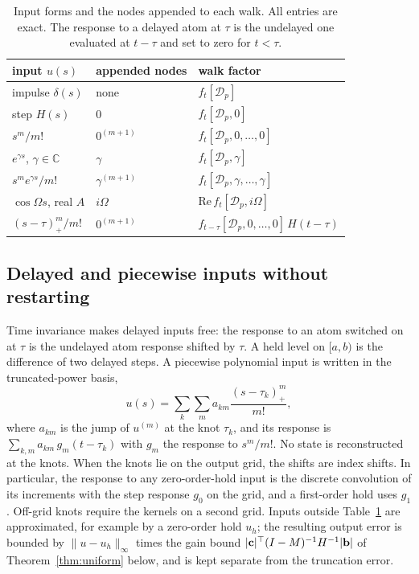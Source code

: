 \begin{table}[t]
\caption{Input forms and the nodes appended to each walk. All entries are exact. The response to a delayed atom at $\tau$ is the undelayed one evaluated at $t-\tau$ and set to zero for $t<\tau$.}\label{tab:inputs}
\footnotesize\setlength{\tabcolsep}{2pt}
\begin{ruledtabular}
\begin{tabular}{lll}
input $u(s)$ & appended nodes & walk factor\\\hline
impulse $\delta(s)$ & none & $f_t[\mathcal{D}_p]$\\
step $H(s)$ & $0$ & $f_t[\mathcal{D}_p,0]$\\
$s^m/m!$ & $0^{(m+1)}$ & $f_t[\mathcal{D}_p,0,\dots,0]$\\
$e^{\gamma s}$, $\gamma\in\mathbb{C}$ & $\gamma$ & $f_t[\mathcal{D}_p,\gamma]$\\
$s^me^{\gamma s}/m!$ & $\gamma^{(m+1)}$ & $f_t[\mathcal{D}_p,\gamma,\dots,\gamma]$\\
$\cos\Omega s$, real $A$ & $i\Omega$ & $\mathrm{Re}\,f_t[\mathcal{D}_p,i\Omega]$\\
$(s-\tau)_+^m/m!$ & $0^{(m+1)}$ & $f_{t-\tau}[\mathcal{D}_p,0,\dots,0]\,H(t-\tau)$\\
\end{tabular}
\end{ruledtabular}
\end{table}

\subsection{Delayed and piecewise inputs without restarting}\label{sec:piecewise}
Time invariance makes delayed inputs free: the response to an atom switched on at $\tau$ is the undelayed atom response shifted by $\tau$. A held level on $[a,b)$ is the difference of two delayed steps. A piecewise polynomial input is written in the truncated-power basis,
\begin{equation}\label{eq:truncpow}
u(s)=\sum_k\sum_{m}a_{km}\frac{(s-\tau_k)_+^m}{m!},
\end{equation}
where $a_{km}$ is the jump of $u^{(m)}$ at the knot $\tau_k$, and its response is $\sum_{k,m}a_{km}\,g_m(t-\tau_k)$ with $g_m$ the response to $s^m/m!$. No state is reconstructed at the knots. When the knots lie on the output grid, the shifts are index shifts. In particular, the response to any zero-order-hold input is the discrete convolution of its increments with the step response $g_0$ on the grid, and a first-order hold uses $g_1$. Off-grid knots require the kernels on a second grid. Inputs outside Table~\ref{tab:inputs} are approximated, for example by a zero-order hold $u_h$; the resulting output error is bounded by $\|u-u_h\|_\infty$ times the gain bound $|{\bf c}|^\top(I-M)^{-1}H^{-1}|{\bf b}|$ of Theorem~\ref{thm:uniform} below, and is kept separate from the truncation error.

